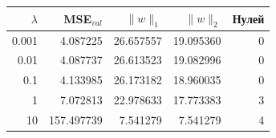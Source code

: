 \begin{tabular}{rrrrr}
\toprule
$\lambda$ & MSE$_{val}$ & $\|w\|_1$ & $\|w\|_2$ & Нулей \\
\midrule
0.001 & 4.087225 & 26.657557 & 19.095360 & 0 \\
0.01 & 4.087737 & 26.613523 & 19.082996 & 0 \\
0.1 & 4.133985 & 26.173182 & 18.960035 & 0 \\
1 & 7.072813 & 22.978633 & 17.773383 & 3 \\
10 & 157.497739 & 7.541279 & 7.541279 & 4 \\
\bottomrule
\end{tabular}
